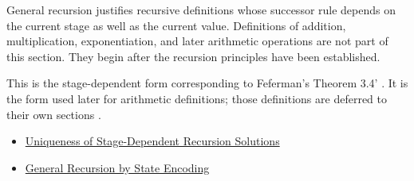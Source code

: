 \begin{remark*}[Interpretation]
General recursion justifies recursive definitions whose successor rule depends
on the current stage as well as the current value. Definitions of addition,
multiplication, exponentiation, and later arithmetic operations are not part
of this section. They begin after the recursion principles have been
established.
\end{remark*}

\begin{remark*}
This is the stage-dependent form corresponding to Feferman's Theorem 3.4'
\citep{FefermanNumberSystems1964}. It is the form used later for arithmetic
definitions; those definitions are deferred to their own sections
\citep{FefermanNumberSystems1964,MendelsonNumberSystemsFoundationsAnalysis}.
\end{remark*}

\begin{dependencies}
\begin{itemize}
  \item \hyperref[lem:uniqueness-of-general-recursive-functions]{Uniqueness of Stage-Dependent Recursion Solutions}
  \item \hyperref[thm:general-recursion-by-state-encoding]{General Recursion by State Encoding}
\end{itemize}
\end{dependencies}


